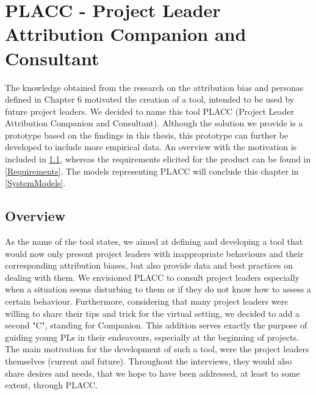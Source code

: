 \chapter{PLACC - Project Leader Attribution Companion and Consultant}


The knowledge obtained from the research on the attribution bias and personas defined in Chapter 6 motivated the creation of a tool,  intended to be used by future project leaders. We decided to name this tool PLACC (Project Leader Attribution Companion and Consultant). Although the solution we provide is a prototype based on the findings in this thesis, this prototype can further be developed to include more empirical data. An overview with the motivation is included in \ref{Overview}, whereas the requirements elicited for the product can be found in \ref{Requirements}. The models representing PLACC will conclude this chapter in \ref{SystemModels}.

\section{Overview} \label{Overview}

As the name of the tool states, we aimed at defining and developing a tool that would now only present project leaders with inappropriate behaviours and their corresponding attribution biases, but also provide data and best practices on dealing with them. We envisioned PLACC to consult project leaders especially when a situation seems disturbing to them or if they do not know how to assess a certain behaviour. 
Furthermore, considering that many project leaders were willing to share their tips and trick for the virtual setting, we decided to add a second "C", standing for Companion. This addition serves exactly the purpose of guiding young PLs in their endeavours, especially at the beginning of projects.
The main motivation for the development of such a tool, were the project leaders themselves (current and future). Throughout the interviews, they would also share desires and needs, that we hope to have been addressed, at least to some extent, through PLACC.

